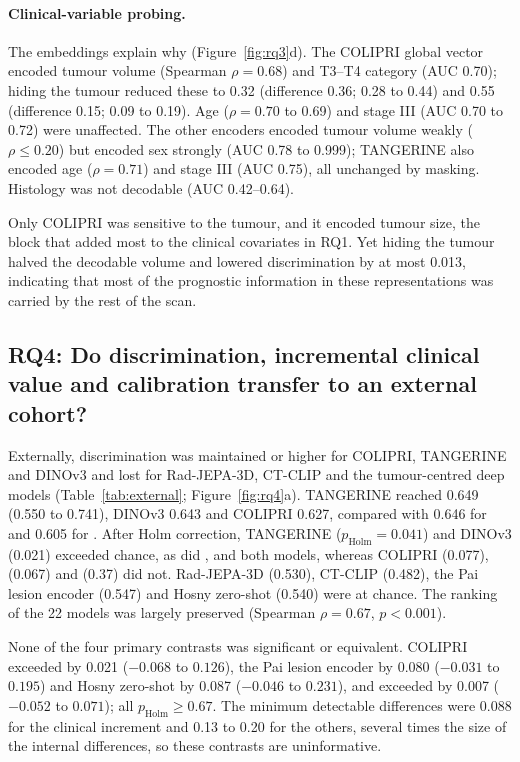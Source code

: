 \paragraph{Clinical-variable probing.} The embeddings explain why (Figure~\ref{fig:rq3}d). The COLIPRI global vector encoded tumour volume (Spearman $\rho=0.68$) and T3--T4 category (AUC 0.70); hiding the tumour reduced these to 0.32 (difference 0.36; 0.28 to 0.44) and 0.55 (difference 0.15; 0.09 to 0.19). Age ($\rho=0.70$ to 0.69) and stage III (AUC 0.70 to 0.72) were unaffected. The other encoders encoded tumour volume weakly ($\rho\leq0.20$) but encoded sex strongly (AUC 0.78 to 0.999); TANGERINE also encoded age ($\rho=0.71$) and stage III (AUC 0.75), all unchanged by masking. Histology was not decodable (AUC 0.42--0.64).

Only COLIPRI was sensitive to the tumour, and it encoded tumour size, the block that added most to the clinical covariates in RQ1. Yet hiding the tumour halved the decodable volume and lowered discrimination by at most 0.013, indicating that most of the prognostic information in these representations was carried by the rest of the scan.


\subsection{RQ4: Do discrimination, incremental clinical value and calibration transfer to an external cohort?}\label{sec:res-rq4}


Externally, discrimination was maintained or higher for COLIPRI, TANGERINE and DINOv3 and lost for Rad-JEPA-3D, CT-CLIP and the tumour-centred deep models (Table~\ref{tab:external}; Figure~\ref{fig:rq4}a). TANGERINE reached 0.649 (0.550 to 0.741), DINOv3 0.643 and COLIPRI 0.627, compared with 0.646 for  and 0.605 for . After Holm correction, TANGERINE ($p_\mathrm{Holm}=0.041$) and DINOv3 (0.021) exceeded chance, as did ,  and both  models, whereas COLIPRI (0.077),  (0.067) and  (0.37) did not. Rad-JEPA-3D (0.530), CT-CLIP (0.482), the Pai lesion encoder (0.547) and Hosny zero-shot (0.540) were at chance. The ranking of the 22 models was largely preserved (Spearman $\rho=0.67$, $p<0.001$).

None of the four primary contrasts was significant or equivalent. COLIPRI exceeded  by 0.021 ($-0.068$ to $0.126$), the Pai lesion encoder by 0.080 ($-0.031$ to $0.195$) and Hosny zero-shot by 0.087 ($-0.046$ to $0.231$), and  exceeded  by 0.007 ($-0.052$ to $0.071$); all $p_\mathrm{Holm}\geq0.67$. The minimum detectable differences were 0.088 for the clinical increment and 0.13 to 0.20 for the others, several times the size of the internal differences, so these contrasts are uninformative.

